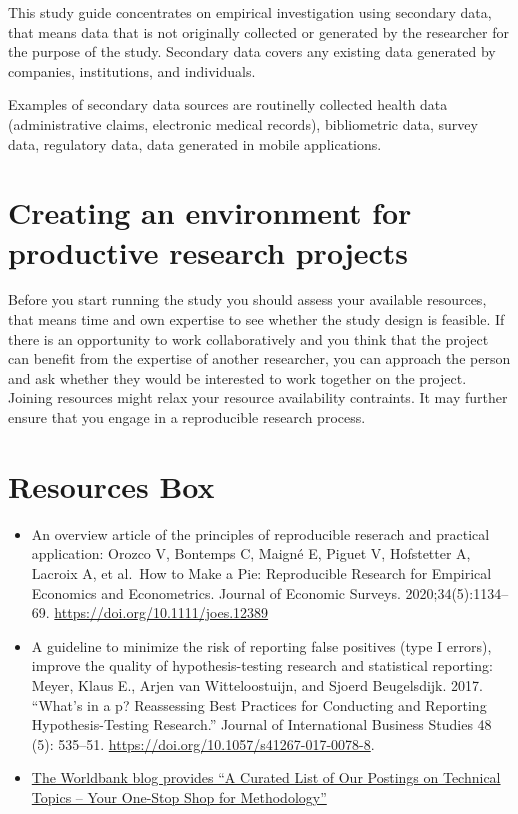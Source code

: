 \documentclass[
]{book}
\begin{document}
This study guide concentrates on empirical investigation using secondary
data, that means data that is not originally collected or generated by
the researcher for the purpose of the study. Secondary data covers any
existing data generated by companies, institutions, and individuals.

Examples of secondary data sources are routinelly collected health data
(administrative claims, electronic medical records), bibliometric data,
survey data, regulatory data, data generated in mobile applications.

\hypertarget{creating-an-environment-for-productive-research-projects}{%
\section{Creating an environment for productive research
projects}\label{creating-an-environment-for-productive-research-projects}}

Before you start running the study you should assess your available
resources, that means time and own expertise to see whether the study
design is feasible. If there is an opportunity to work collaboratively
and you think that the project can benefit from the expertise of another
researcher, you can approach the person and ask whether they would be
interested to work together on the project. Joining resources might
relax your resource availability contraints. It may further ensure that
you engage in a reproducible research process.

\hypertarget{resources-box}{%
\section{Resources Box}\label{resources-box}}

\begin{itemize}
\item
  An overview article of the principles of reproducible reserach and
  practical application: Orozco V, Bontemps C, Maigné E, Piguet V,
  Hofstetter A, Lacroix A, et al.~How to Make a Pie: Reproducible
  Research for Empirical Economics and Econometrics. Journal of Economic
  Surveys. 2020;34(5):1134--69. \url{https://doi.org/10.1111/joes.12389}
\item
  A guideline to minimize the risk of reporting false positives (type I
  errors), improve the quality of hypothesis-testing research and
  statistical reporting: Meyer, Klaus E., Arjen van Witteloostuijn, and
  Sjoerd Beugelsdijk. 2017. ``What's in a p? Reassessing Best Practices
  for Conducting and Reporting Hypothesis-Testing Research.'' Journal of
  International Business Studies 48 (5): 535--51.
  \url{https://doi.org/10.1057/s41267-017-0078-8}.
\item
  \href{https://blogs.worldbank.org/impactevaluations/curated-list-our-postings-technical-topics-your-one-stop-shop-methodology-0}{The
  Worldbank blog provides ``A Curated List of Our Postings on Technical
  Topics -- Your One-Stop Shop for Methodology''}
\end{itemize}
\end{document}
